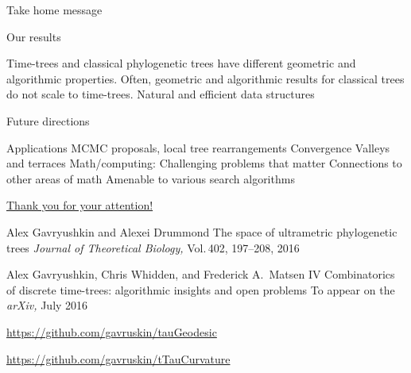 \documentclass{beamer}
\theoremstyle{example}
\begin{document}
\begin{frame}{Take home message}

\begin{block}{Our results}
\begin{outline}
\1 Time-trees and classical phylogenetic trees have different geometric and algorithmic properties.
\1 Often, geometric and algorithmic results for classical trees do not scale to time-trees.
\1 Natural and efficient data structures
\end{outline}
\end{block}

\pause

\begin{block}{\small{Future directions}}
\begin{outline}
\1 Applications
	\2 MCMC proposals, local tree rearrangements
	\2 Convergence
	\2 Valleys and terraces
\1 Math/computing:
	\2 Challenging problems that matter
	\2 Connections to other areas of math
	\2 Amenable to various search algorithms
\end{outline}
\end{block}
\end{frame}

\begin{frame}{\href{http://alex.gavruskin.com/pictures/}{\Large{Thank you for your attention!}}}


\scriptsize

Alex Gavryushkin and Alexei Drummond
\newblock The space of ultrametric phylogenetic trees
\newblock \emph{Journal of Theoretical Biology,} Vol.\,402, 197--208, 2016

Alex Gavryushkin, Chris Whidden, and Frederick A.\ Matsen IV
\newblock Combinatorics of discrete time-trees: algorithmic insights and open problems
\newblock To appear on the {\em arXiv,} July 2016

\url{https://github.com/gavruskin/tauGeodesic}

\url{https://github.com/gavruskin/tTauCurvature}
\end{frame}
\end{document}
